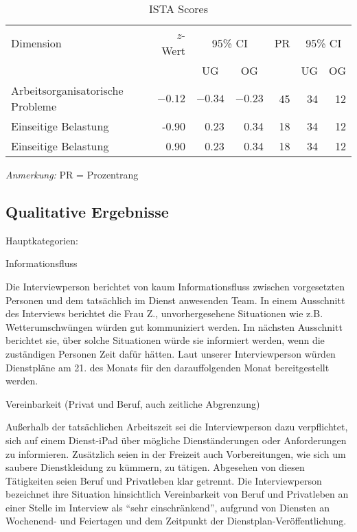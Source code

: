 \documentclass[12pt, a4paper]{article}
\begin{document}
\begin{table}[h]
    \centering
    \begin{threeparttable}
    \caption{ISTA Scores}
    \begin{tabular}{lrrrrrr}
        \toprule
        Dimension & {$z$-Wert} & \multicolumn{2}{c}{95\% CI}  & PR & \multicolumn{2}{c}{95\% CI} \\
        \cmidrule(lr){3-4} \cmidrule(lr){6-7}
         & & \multicolumn{1}{c}{UG}  & \multicolumn{1}{c}{OG} & & \multicolumn{1}{c}{UG} & \multicolumn{1}{c}{OG} \\
        \midrule
        Arbeitsorganisatorische Probleme & $-0.12$ & $-0.34$ & $-0.23$ & 45 & 34 & 12\\
        Einseitige Belastung & -0.90 & 0.23 & 0.34 & 18 & 34 & 12 \\
        Einseitige Belastung & 0.90 & 0.23 & 0.34 & 18 & 34 & 12 \\
        \bottomrule
    \end{tabular}
    \begin{tablenotes}[flushleft]
        \small
        \item \textit{Anmerkung:} PR = Prozentrang
    \end{tablenotes}
    \end{threeparttable}
\end{table}

\subsection{Qualitative Ergebnisse}

Hauptkategorien:

Informationsfluss

Die Interviewperson berichtet von kaum Informationsfluss zwischen vorgesetzten Personen und dem tatsächlich im Dienst anwesenden Team. 
In einem Ausschnitt des Interviews berichtet die Frau Z., unvorhergesehene Situationen wie z.B. Wetterumschwüngen würden gut kommuniziert werden.
 Im nächsten Ausschnitt berichtet sie, über solche Situationen würde sie informiert werden, wenn die zuständigen Personen Zeit dafür hätten.
  Laut unserer Interviewperson würden Dienstpläne am 21. des Monats für den darauffolgenden Monat bereitgestellt werden.

Vereinbarkeit (Privat und Beruf, auch zeitliche Abgrenzung)

Außerhalb der tatsächlichen Arbeitszeit sei die Interviewperson dazu verpflichtet, sich auf einem Dienst-iPad über mögliche Dienständerungen
 oder Anforderungen zu informieren. Zusätzlich seien in der Freizeit auch Vorbereitungen, wie sich um saubere Dienstkleidung zu kümmern, zu tätigen.
  Abgesehen von diesen Tätigkeiten seien Beruf und Privatleben klar getrennt.
Die Interviewperson bezeichnet ihre Situation hinsichtlich Vereinbarkeit von Beruf und Privatleben an einer Stelle im Interview als “sehr einschränkend”, aufgrund von Diensten an Wochenend- und Feiertagen und dem Zeitpunkt der Dienstplan-Veröffentlichung.
\end{document}
